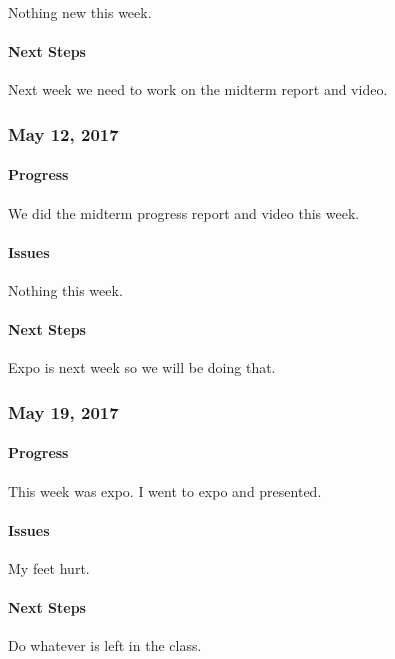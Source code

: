 \documentclass[10pt,onecolumn,journal,draftclsnofoot]{IEEEtran}
\begin{document}
Nothing new this week.

\paragraph{Next Steps} 

Next week we need to work on the midterm report and video.

\subsubsection{May 12, 2017} 

\paragraph{Progress} 

We did the midterm progress report and video this week.

\paragraph{Issues} 

Nothing this week.

\paragraph{Next Steps} 

Expo is next week so we will be doing that.

\subsubsection{May 19, 2017} 

\paragraph{Progress} 

This week was expo. I went to expo and presented.

\paragraph{Issues} 

My feet hurt.

\paragraph{Next Steps} 

Do whatever is left in the class.
\end{document}
